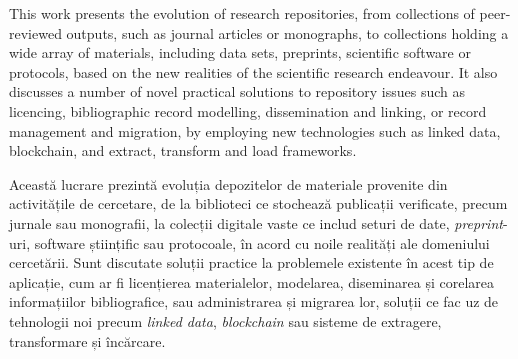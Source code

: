 This work presents the evolution of research repositories, from collections of peer-reviewed outputs, such as journal articles or monographs, to collections holding a wide array of materials, including data sets, preprints, scientific software or protocols, based on the new realities of the scientific research endeavour. It also discusses a number of novel practical solutions to repository issues such as licencing, bibliographic record modelling, dissemination and linking, or record management and migration, by employing new technologies such as linked data, blockchain, and extract, transform and load frameworks.\\\par


\noindent Această lucrare prezintă evoluția depozitelor de materiale provenite din activitățile de cercetare, de la biblioteci ce stochează publicații verificate, precum jurnale sau monografii, la colecții digitale vaste ce includ seturi de date, \emph{preprint}-uri, software științific sau protocoale, în acord cu noile realități ale domeniului cercetării. Sunt discutate soluții practice la problemele existente în acest tip de aplicație, cum ar fi licențierea materialelor, modelarea, diseminarea și corelarea informațiilor bibliografice, sau administrarea și migrarea lor, soluții ce fac uz de tehnologii noi precum \emph{linked data}, \emph{blockchain} sau sisteme de extragere, transformare și încărcare.  